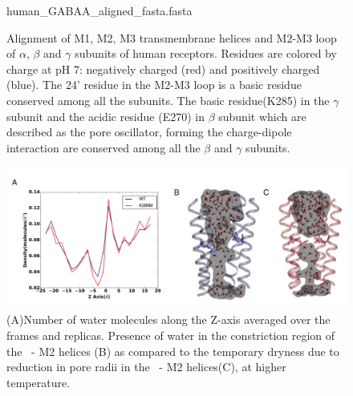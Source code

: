 \documentclass[9pt,onecolumn,oneside,lineno]{pnas-new}
\begin{document}
\begin{figure}
\begin{texshade}{human_GABAA_aligned_fasta.fasta} 
\shadeallresidues
{}
\gapchar{-}
\featurerule{1pt}
\hideconsensus
\end{texshade}
\caption{Alignment of M1, M2, M3 transmembrane helices and M2-M3 loop of  $\alpha$, $\beta$ and $\gamma$ subunits of  human \GABAA  receptors. Residues are colored by charge at pH 7: negatively charged (red) and positively charged (blue). The 24' residue in the M2-M3 loop is a basic residue conserved among all the subunits. The basic residue(K285) in the $\gamma$ subunit and the acidic residue (E270) in $\beta$ subunit which are described as the pore oscillator, forming the charge-dipole interaction are conserved among all the $\beta$ and $\gamma$ subunits.}
\end{figure}

\begin{figure}
\begin{center}
\includegraphics[width = 1\textwidth]{figures_2/water_pore.pdf}
\end{center}
\caption{(A)Number of water molecules along the Z-axis averaged over the frames and replicas. Presence of water in the constriction region of the \WT\ - M2 helices (B) as compared to the temporary dryness due to reduction in pore radii in the  \MT\ - M2 helices(C), at higher temperature. %
}
\label{fig:pore_water}
\end{figure}
\end{document}
